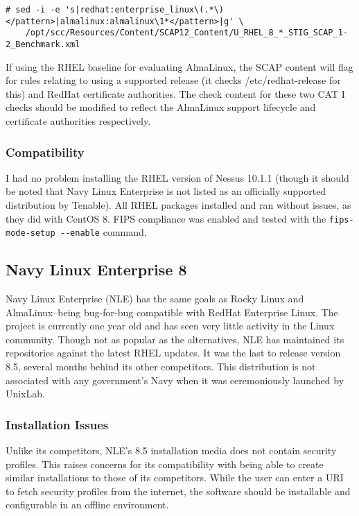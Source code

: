 \begin{lstlisting}[caption={Modify RHEL Benchmark for AlmaLinux},captionpos=b,style=BashStyle,basicstyle=\small,label={lst:20220321:alma},literate=*{-}{-}1,breaklines=true]
# sed -i -e 's|redhat:enterprise_linux\(.*\)</pattern>|almalinux:almalinux\1*</pattern>|g' \
	/opt/scc/Resources/Content/SCAP12_Content/U_RHEL_8_*_STIG_SCAP_1-2_Benchmark.xml
\end{lstlisting}

If using the RHEL baseline for evaluating AlmaLinux, the SCAP content will flag for rules relating to using a supported release (it checks /etc/redhat-release for this) and RedHat certificate authorities. The check content for these two CAT I checks should be modified to reflect the AlmaLinux support lifecycle and certificate authorities respectively.

\subsubsection{Compatibility}
I had no problem installing the RHEL version of Nessus 10.1.1 (though it should be noted that Navy Linux Enterprise is not listed as an officially supported distribution by Tenable). All RHEL packages installed and ran without issues, as they did with CentOS 8. FIPS compliance was enabled and tested with the \texttt{fips-mode-setup -\phantom{}-enable} command.

\subsection{Navy Linux Enterprise 8}
Navy Linux Enterprise (NLE) has the same goals as Rocky Linux and AlmaLinux--being bug-for-bug compatible with RedHat Enterprise Linux. The project is currently one year old and has seen very little activity in the Linux community. Though not as popular as the alternatives, NLE has maintained its repositories against the latest RHEL updates. It was the last to release version 8.5, several months behind its other competitors. This distribution is not associated with any government's Navy when it was ceremoniously launched by UnixLab.

\subsubsection{Installation Issues}
Unlike its competitors, NLE's 8.5 installation media does not contain security profiles. This raises concerns for its compatibility with being able to create similar installations to those of its competitors. While the user can enter a URI to fetch security profiles from the internet, the software should be installable and configurable in an offline environment.

